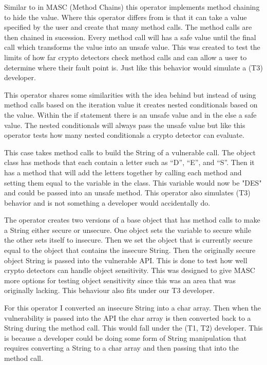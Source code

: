  Similar to in MASC  (Method Chains) this operator implements method chaining to hide the value. Where this operator differs from  is that it can take a value specified by the user and create that many method calls. The method calls are then chained in sucession. Every method call will has a safe value until the final call which transforms the value into an unsafe value. This was created to test the limits of how far crypto detectors check method calls and can allow a user to determine where their fault point is. Just like  this behavior would simulate a (T3) developer.

 This operator shares some similarities with the idea behind  but instead of using method calls based on the iteration value it creates nested conditionals based on the value. Within the if statement there is an unsafe value and in the else a safe value. The nested conditionals will always pass the unsafe value but like  this operator tests how many nested conditionals a crypto detector can evaluate.

 This case takes method calls to build the String of a vulnerable call. The object class has methods that each contain a letter such as “D”, “E”, and “S”. Then it has a method that will add the letters together by calling each method and setting them equal to the variable in the class. This variable would now be "DES" and could be passed into an unsafe method. This operator also simulates (T3) behavior and is not something a developer would accidentally do. 

 The operator creates two versions of a base object that has method calls to make a String either secure or unsecure. One object sets the variable to secure while the other sets itself to insecure. Then we set the object that is currently secure equal to the object that contains the insecure String. Then the originally secure object String is passed into the vulnerable API. This is done to test how well crypto detectors can handle object sensitivity. This was designed to give MASC more options for testing object sensitivity since this was an area that was originally lacking. This behaviour also fits under our T3 developer.

 For this operator I converted an insecure String into a char array. Then when the vulnerability is passed into the API the char array is then converted back to a String during the method call. This would fall under the (T1, T2) developer. This is because a developer could be doing some form of String manipulation that requires converting a String to a char array and then passing that into the method call. 

